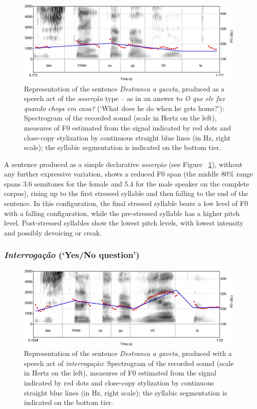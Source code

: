 \documentclass[output=paper]{LSP/langsci}
\begin{document}
\begin{figure}

\includegraphics[width=0.99\textwidth]{figures/MOR3.eps}
\caption{Representation of the sentence \textit{Destranca a gaveta}, produced as a speech act of  the \textit{asserção} type -- as in an answer to \textit{O que ele faz quando chega em casa?} (`What does he do when he gets home?'): Spectrogram of the recorded sound (scale in Hertz on the left), measures of F0 estimated from the signal indicated by red dots and close-copy stylization by continuous straight blue lines (in Hz, right scale); the syllabic segmentation is indicated on the bottom tier.}
\label{figure:CC1}
\end{figure}

A sentence produced as a simple declarative \textit{asserção} (see Figure ~\ref{figure:CC1}), without any further expressive variation, shows a reduced F0 span (the middle 80\% range spans 3.6 semitones for the female and 5.4 for the male speaker on the complete corpus), rising up to the first stressed syllable and then falling to the end of the sentence. 
In this configuration, the final stressed syllable bears a low level of F0 with a falling configuration, while the pre-stressed syllable has a higher pitch level. 
Post-stressed syllables show the lowest pitch levels, with lowest intensity and possibly devoicing or creak.


\subsubsection{\textit{Interrogação} (`Yes/No question')}

\begin{figure}

\includegraphics[width=0.99\textwidth]{figures/MOR4.eps}
\caption{Representation of the sentence \textit{Destranca a gaveta}, produced with a speech act of \textit{interrogação}: Spectrogram of the recorded sound (scale in Hertz on the left), measures of F0 estimated from the signal indicated by red dots and close-copy stylization by continuous straight blue lines (in Hz, right scale); the syllabic segmentation is indicated on the bottom tier.}
\label{figure:CC2}
\end{figure}
\end{document}
